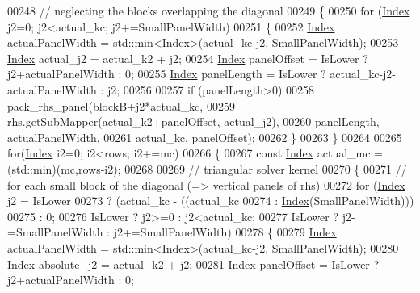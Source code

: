 \begin{DoxyCode}
00248       \textcolor{comment}{// neglecting the blocks overlapping the diagonal}
00249       \{
00250         \textcolor{keywordflow}{for} (\hyperlink{namespace_eigen_a62e77e0933482dafde8fe197d9a2cfde}{Index} j2=0; j2<actual\_kc; j2+=SmallPanelWidth)
00251         \{
00252           \hyperlink{namespace_eigen_a62e77e0933482dafde8fe197d9a2cfde}{Index} actualPanelWidth = std::min<Index>(actual\_kc-j2, SmallPanelWidth);
00253           \hyperlink{namespace_eigen_a62e77e0933482dafde8fe197d9a2cfde}{Index} actual\_j2 = actual\_k2 + j2;
00254           \hyperlink{namespace_eigen_a62e77e0933482dafde8fe197d9a2cfde}{Index} panelOffset = IsLower ? j2+actualPanelWidth : 0;
00255           \hyperlink{namespace_eigen_a62e77e0933482dafde8fe197d9a2cfde}{Index} panelLength = IsLower ? actual\_kc-j2-actualPanelWidth : j2;
00256 
00257           \textcolor{keywordflow}{if} (panelLength>0)
00258           pack\_rhs\_panel(blockB+j2*actual\_kc,
00259                          rhs.getSubMapper(actual\_k2+panelOffset, actual\_j2),
00260                          panelLength, actualPanelWidth,
00261                          actual\_kc, panelOffset);
00262         \}
00263       \}
00264 
00265       \textcolor{keywordflow}{for}(\hyperlink{namespace_eigen_a62e77e0933482dafde8fe197d9a2cfde}{Index} i2=0; i2<rows; i2+=mc)
00266       \{
00267         \textcolor{keyword}{const} \hyperlink{namespace_eigen_a62e77e0933482dafde8fe197d9a2cfde}{Index} actual\_mc = (std::min)(mc,rows-i2);
00268 
00269         \textcolor{comment}{// triangular solver kernel}
00270         \{
00271           \textcolor{comment}{// for each small block of the diagonal (=> vertical panels of rhs)}
00272           \textcolor{keywordflow}{for} (\hyperlink{namespace_eigen_a62e77e0933482dafde8fe197d9a2cfde}{Index} j2 = IsLower
00273                       ? (actual\_kc - ((actual\_kc%
00274                                                                   : \hyperlink{namespace_eigen_a62e77e0933482dafde8fe197d9a2cfde}{Index}(SmallPanelWidth)))
00275                       : 0;
00276                IsLower ? j2>=0 : j2<actual\_kc;
00277                IsLower ? j2-=SmallPanelWidth : j2+=SmallPanelWidth)
00278           \{
00279             \hyperlink{namespace_eigen_a62e77e0933482dafde8fe197d9a2cfde}{Index} actualPanelWidth = std::min<Index>(actual\_kc-j2, SmallPanelWidth);
00280             \hyperlink{namespace_eigen_a62e77e0933482dafde8fe197d9a2cfde}{Index} absolute\_j2 = actual\_k2 + j2;
00281             \hyperlink{namespace_eigen_a62e77e0933482dafde8fe197d9a2cfde}{Index} panelOffset = IsLower ? j2+actualPanelWidth : 0;

\end{DoxyCode}
